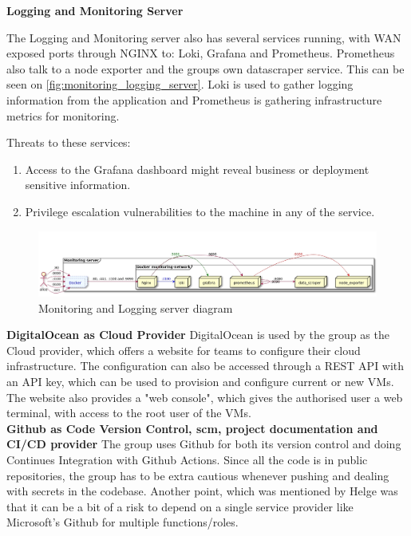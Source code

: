 \textbf{Logging and Monitoring Server}

The Logging and Monitoring server also has several services running, with WAN exposed ports through NGINX to: Loki, Grafana and Prometheus. Prometheus also talk to a node exporter and the groups own datascraper service. This can be seen on \autoref{fig:monitoring_logging_server}.
Loki is used to gather logging information from the application and Prometheus is gathering  infrastructure metrics for monitoring. 

Threats to these services:

\begin{enumerate}
    \item Access to the Grafana dashboard might reveal business or deployment sensitive information.
    \item Privilege escalation vulnerabilities to the machine in any of the service.
\end{enumerate}


\begin{figure}[H]
    \centering
    \includegraphics[scale=0.3]{images/logging/monitoring_logging.jpg}
    \caption{Monitoring and Logging server diagram}
    \label{fig:monitoring_logging_server}
\end{figure}

\textbf{DigitalOcean as Cloud Provider}
DigitalOcean is used by the group as the Cloud provider, which offers a website for teams to configure their cloud infrastructure. The configuration can also be accessed through a REST API with an API key, which can be used to provision and configure current or new VMs. The website also provides a "web console", which gives the authorised user a web terminal, with access to the root user of the VMs.\\ 

\textbf{Github as Code Version Control, \acrshort{scm}, project documentation and CI/CD provider}
The group uses Github for both its version control and doing Continues Integration with Github Actions. Since all the code is in public repositories, the group has to be extra cautious whenever pushing and dealing with secrets in the codebase. Another point, which was mentioned by Helge was that it can be a bit of a risk to depend on a single service provider like Microsoft's Github for multiple functions/roles.\\ 

